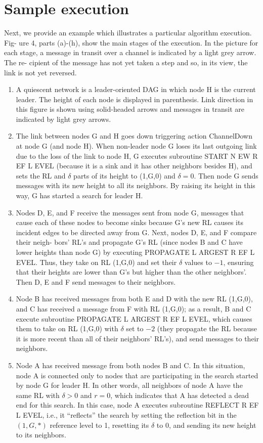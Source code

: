 \section{Sample execution}
Next, we provide an example which illustrates a particular algorithm execution. Fig- ure 4, parts (a)-(h), show the main stages of the execution. In the picture for each stage, a message in transit over a channel is indicated by a light grey arrow. The re- cipient of the message has not yet taken a step and so, in its view, the link is not yet reversed.
\begin{enumerate}[label=\alph*)]
	\item A quiescent network is a leader-oriented DAG in which node H is the current leader. The height of each node is displayed in parenthesis. Link direction in this figure is shown using solid-headed arrows and messages in transit are indicated by light grey arrows.
	\item The link between nodes G and H goes down triggering action ChannelDown at node G (and node H). When non-leader node G loses its last outgoing link due to the loss of the link to node H, G executes subroutine START N EW R EF L EVEL (because it is a sink and it has other neighbors besides H), and sets the RL and $\delta$ parts of its height to (1,G,0) and $\delta = 0$. Then node G sends messages with its new height to all its neighbors. By raising its height in this way, G has started a search for leader H.
	\item Nodes D, E, and F receive the messages sent from node G, messages that cause each of these nodes to become sinks because G’s new RL causes its incident edges to be directed away from G. Next, nodes D, E, and F compare their neigh- bors’ RL’s and propagate G’s RL (since nodes B and C have lower heights than node G) by executing PROPAGATE L ARGEST R EF L EVEL. Thus, they take on RL (1,G,0) and set their $\delta$ values to $-1$, ensuring that their heights are lower than G’s but higher than the other neighbors’. Then D, E and F send messages to their neighbors.
	\item Node B has received messages from both E and D with the new RL (1,G,0), and C has received a message from F with RL (1,G,0); as a result, B and C execute subroutine PROPAGATE L ARGEST R EF L EVEL, which causes them to take on RL (1,G,0) with $\delta$ set to $-2$ (they propagate the RL because it is more recent than all of their neighbors’ RL’s), and send messages to their neighbors.
	\item Node A has received message from both nodes B and C. In this situation, node A is connected only to nodes that are participating in the search started by node G for leader H. In other words, all neighbors of node A have the same RL with $\delta > 0$ and $r = 0$, which indicates that A has detected a dead end for this search. In this case, node A executes subroutine REFLECT R EF L EVEL, i.e., it “reflects” the search by setting the reflection bit in the $(1,G,*)$ reference level to 1, resetting its $\delta$ to 0, and sending its new height to its neighbors.

\end{enumerate}
